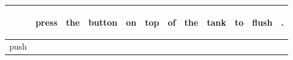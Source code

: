 \documentclass[landscape]{article}
\newcommand{\ssp}{\hspace{2pt}}
\begin{document}
\noindent\begin{tabular}{|l|p{10pt}|p{10pt}|p{10pt}|p{10pt}|p{10pt}|p{10pt}|p{10pt}|p{10pt}|p{10pt}|p{10pt}|p{10pt}|}
\hline
&\begin{sideways}\cellcolor{ref0}press\hspace{12pt}\end{sideways}&\begin{sideways}\cellcolor{ref1}the\hspace{12pt}\end{sideways}&\begin{sideways}\cellcolor{ref2}button\hspace{12pt}\end{sideways}&\begin{sideways}\cellcolor{ref3}on\hspace{12pt}\end{sideways}&\begin{sideways}\cellcolor{ref4}top\hspace{12pt}\end{sideways}&\begin{sideways}\cellcolor{ref5}of\hspace{12pt}\end{sideways}&\begin{sideways}\cellcolor{ref6}the\hspace{12pt}\end{sideways}&\begin{sideways}\cellcolor{ref7}tank\hspace{12pt}\end{sideways}&\begin{sideways}\cellcolor{ref8}to\hspace{12pt}\end{sideways}&\begin{sideways}\cellcolor{ref9}flush\hspace{12pt}\end{sideways}&\begin{sideways}\cellcolor{ref10}.\hspace{12pt}\end{sideways}\\
\hline
\ssp push \ssp&\hspace{2pt}&\hspace{2pt}&\hspace{2pt}&\hspace{2pt}&\hspace{2pt}&\hspace{2pt}&\hspace{2pt}&\hspace{2pt}&\hspace{2pt}&\hspace{2pt}&\hspace{2pt}\\

\end{tabular}
\end{document}
